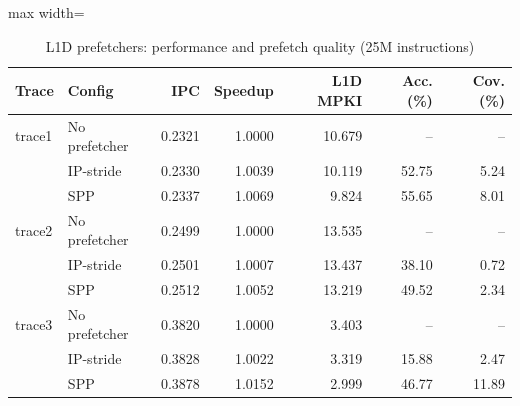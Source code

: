 \begin{table}[t]
\centering
\caption{L1D prefetchers: performance and prefetch quality (25M instructions)}
\label{tab:task1}
\footnotesize
\setlength{\tabcolsep}{3pt}
\begin{adjustbox}{max width=\linewidth}
\begin{tabular}{llrrrrr}
\toprule
Trace & Config & IPC & Speedup & L1D MPKI & Acc. (\%) & Cov. (\%) \\
\midrule
trace1 & No prefetcher & 0.2321 & 1.0000 & 10.679 & -- & -- \\
 & IP-stride & 0.2330 & 1.0039 & 10.119 & 52.75 & 5.24 \\
 & SPP & 0.2337 & 1.0069 & 9.824 & 55.65 & 8.01 \\
\midrule
trace2 & No prefetcher & 0.2499 & 1.0000 & 13.535 & -- & -- \\
 & IP-stride & 0.2501 & 1.0007 & 13.437 & 38.10 & 0.72 \\
 & SPP & 0.2512 & 1.0052 & 13.219 & 49.52 & 2.34 \\
\midrule
trace3 & No prefetcher & 0.3820 & 1.0000 & 3.403 & -- & -- \\
 & IP-stride & 0.3828 & 1.0022 & 3.319 & 15.88 & 2.47 \\
 & SPP & 0.3878 & 1.0152 & 2.999 & 46.77 & 11.89 \\
\bottomrule
\end{tabular}
\end{adjustbox}
\end{table}

